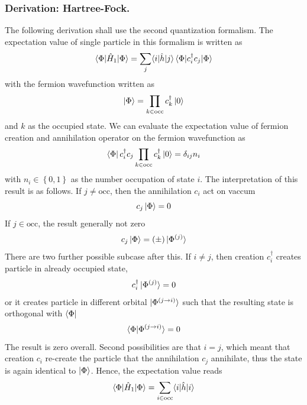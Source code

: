 \documentclass[../../../main.tex]{subfiles}
\begin{document}
\subsubsection{Derivation: Hartree-Fock.}
The following derivation shall use the second quantization formalism.
The expectation value of single particle in this formalism is written as
\begin{equation*}
  \braket{\Phi  | \hat{H}_1|\Phi} = \sum_{j}   \langle i|\hat{h}|j\rangle \braket{\Phi  | c_i^\dagger c_j|\Phi}
\end{equation*}
with the fermion wavefunction written as
\begin{equation*}
  \ket{\Phi }= \prod_{k \in \text{occ}} c ^\dagger_k \ket{0}
\end{equation*}
and $k$ as the occupied state.
We can evaluate the expectation value of fermion creation and annihilation operator on the fermion wavefunction as
\begin{equation*}
  \bra{\Phi} c ^\dagger_i  c_j \prod_{k \in \text{occ}} c ^\dagger_k \ket{0} = \delta_{ij}n_i
\end{equation*}
with $n_i\in \left\{ 0,1 \right\} $ as the number occupation of state $i$.
The interpretation of this result is as follows.
If $j \neq \text{occ}$, then the annihilation $c_i$ act on vaccum
\begin{equation*}
  c_j \ket{\Phi} =0
\end{equation*}
If $j \in \text{occ}$, the result generally not zero
\begin{equation*}
  c_j \ket{\Phi} = (\pm) \ket{\Phi^{(j)}}
\end{equation*}
There are two further possible subcase after this.
If $i \neq j$, then creation $c ^\dagger_i$ creates particle in already occupied state,
\begin{equation*}
  c ^\dagger_i \ket{\Phi^{(j)}} = 0
\end{equation*}
or it creates particle in different orbital $\ket{\Phi^{(j \to i)}}$ such that the resulting state is orthogonal with $\bra{\Phi}$
\begin{equation*}
  \braket{\Phi  | \Phi^{(j \to i)}} = 0
\end{equation*}
The result is zero overall.
Second possibilities are that $i =j$, which meant that creation $c_i$ re-create the particle that the annihilation $c_j$ annihilate, thus the state is again identical to $\ket{\Phi}$.
Hence, the expectation value reads
\begin{equation*}
  \braket{\Phi  | \hat{H}_1|\Phi}
  = \sum_{i \in \text{occ}}   \langle i|\hat{h}|i\rangle
\end{equation*}
\end{document}
